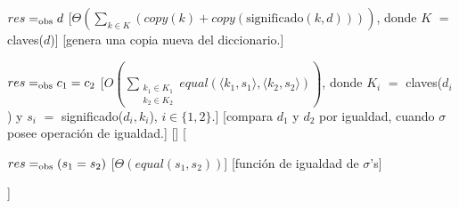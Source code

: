\documentclass[10pt, a4paper]{article}
\begin{document}
\begin{Algoritmos}
\begin{Interfaz}
            {$res =_{\mathrm{obs}} d$}
            [$\displaystyle\Theta\left(\sum_{k \in K}\left(copy(k) + copy(\text{significado}(k,d))\right)\right)$, donde $K$ $=$ claves($d$)]
            [genera una copia nueva del diccionario.]
        
            {$res =_{\mathrm{obs}} c_1 = c_2$}
            [$\displaystyle O\left(\sum_{\substack{k_1 \in K_1\\k_2\in K_2}}equal(\langle k_1,s_1\rangle, \langle k_2, s_2 \rangle)\right)$, donde $K_i$ $=$ claves($d_i$) y $s_i$ $=$ significado($d_i, k_i$), $i \in \{1,2\}$.]
            [compara $d_1$ y $d_2$ por igualdad, cuando $\sigma$ posee operación de igualdad.]
            []%
            [{\parbox[t]{\textwidth-3cm}{%
            {$res =_{\mathrm{obs}} (s_1 = s_2)$}
            [$\Theta(equal(s_1, s_2))$]
            [función de igualdad de $\sigma$'s]
            }}]

        \begin{comment}

        \textbf{Algoritmos del iterador}	

        \begin{algorithm}[H]
            \begin{algorithmic}[1]
                \State \textbf{iCrearIt}(\In{l}{lst}) $\to$ $res$ : iter

                \State $res \gets \langle l.primero, l \rangle$ 	\Comment $\Theta(1)$

                \medskip
                \Statex \underline{Complejidad:} $\Theta(1)$
            \end{algorithmic}
        \end{algorithm}	

        \begin{algorithm}[H]
            \begin{algorithmic}[1]
                \State \textbf{iCrearItUlt}(\In{l}{lst}) $\to$ $res$ : iter

                \State $res \gets \langle NULL, l \rangle$	\Comment $\Theta(1)$

                \medskip
                \Statex \underline{Complejidad:} $\Theta(1)$
            \end{algorithmic}
        \end{algorithm}


\end{comment}
\end{Interfaz}
\end{Algoritmos}
\end{document}
